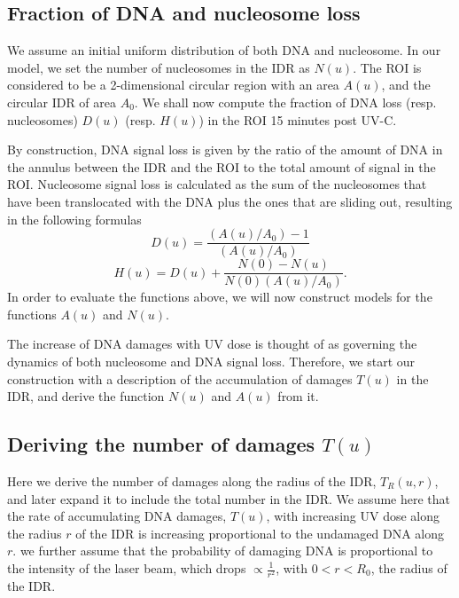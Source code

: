 \documentclass[12pt]{article}
\begin{document}
\subsection{Fraction of DNA and nucleosome loss }\label{subsection:fractionOfDNAandNucleosomeLoss}
We assume an initial uniform distribution of both DNA and nucleosome. 
In our model, we set the number of nucleosomes in the IDR as $N(u)$. The ROI is considered to be a 2-dimensional circular region with an area $A(u)$, and the circular IDR of area $A_0$. 
We shall now compute the fraction of DNA loss (resp. nucleosomes) $D(u)$ (resp. $H(u)$) in the ROI 15 minutes post UV-C. 

By construction, DNA signal loss is given by the ratio of the amount of DNA in the annulus between the IDR and the ROI to the total amount of signal in the ROI. Nucleosome signal loss is calculated as the sum of the nucleosomes that have been translocated with the DNA plus the ones that are sliding out, resulting in the following formulas
\begin{equation}\label{eq:DNAStSt}
D(u)= \frac{(A(u)/A_0) -1}{(A(u)/A_0)}
\end{equation}
\begin{equation}
\label{eq:histoneStSt}
H(u)=D(u)+\frac{N(0)-N(u)}{N(0)(A(u)/A_0)}.
\end{equation}
In order to evaluate the functions above, we will now construct models for the functions $A(u)$ and $N(u)$.

The increase of DNA damages with UV dose is thought of as governing the dynamics of both nucleosome and DNA signal loss. Therefore, we start our construction with a description of the accumulation of damages $T(u)$ in the IDR, and derive the function $N(u)$ and $A(u)$ from it.

\subsection{Deriving the number of damages $T(u)$}
Here we derive the number of damages along the radius of the IDR, $T_R(u,r)$, and later expand it to include the total number in the IDR. We assume here that the rate of accumulating DNA damages, $T(u)$, with increasing UV dose along the radius $r$ of the IDR is increasing proportional to the undamaged DNA along $r$.
we further assume that the probability of damaging DNA is proportional to the intensity of the laser beam, which drops $\propto \frac{1}{r^2}$, with $0<r<R_0$, the radius of the IDR.
\end{document}
